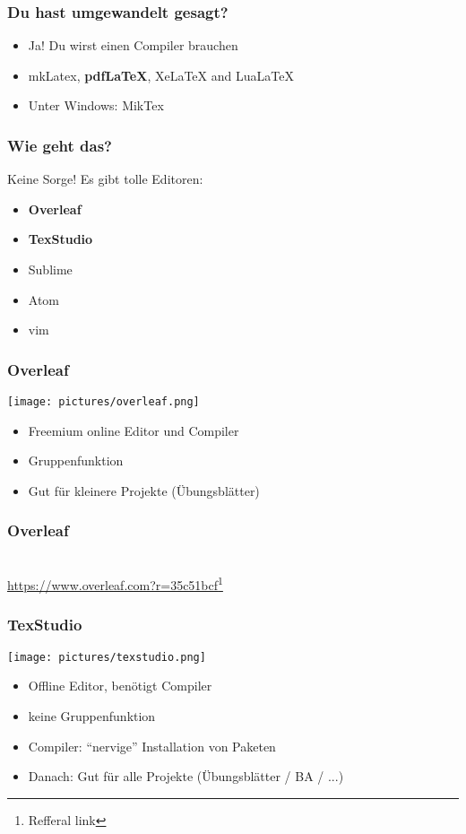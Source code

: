 \documentclass{beamer}
\begin{document}
\begin{frame}
     \frametitle{Du hast umgewandelt gesagt?}
     \begin{itemize}[<+->]
          \item Ja! Du wirst einen Compiler brauchen
               \item mkLatex, \textbf{pdfLaTeX}, XeLaTeX and LuaLaTeX
               \item Unter Windows: MikTex
     \end{itemize}
\end{frame}




\begin{frame}
     \frametitle{Wie geht das?}
     Keine Sorge! Es gibt tolle Editoren:
     \begin{itemize}[<+->]
          \item \textbf{Overleaf}
          \item \textbf{TexStudio}
          \item Sublime 
          \item Atom
          \item vim
     \end{itemize}
\end{frame}

\begin{frame}
	\frametitle{Overleaf}
	\texttt{[image: pictures/overleaf.png]}
	\begin{itemize}[<+->]
		\item Freemium online Editor und Compiler
		\item Gruppenfunktion
		\item Gut für kleinere Projekte (Übungsblätter)
	\end{itemize}
\end{frame}


\begin{frame}
	\frametitle{Overleaf}
	\centering
	\\
	\url{https://www.overleaf.com?r=35c51bcf}\footnote{Refferal link}
\end{frame}

\begin{frame}
	\frametitle{TexStudio}
	\texttt{[image: pictures/texstudio.png]}
	\begin{itemize}[<+->]
		\item Offline Editor, benötigt Compiler
		\item keine Gruppenfunktion
		\item Compiler: ``nervige'' Installation von Paketen
		\item Danach: Gut für alle Projekte (Übungsblätter / BA / ...)
	\end{itemize}
\end{frame}
\end{document}
